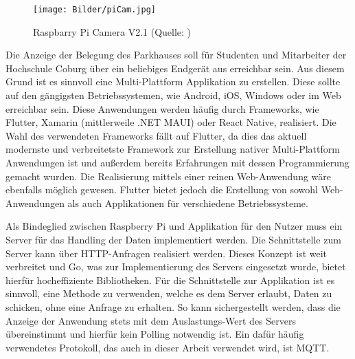 \begin{figure}[h]
	\myImagePos{}
	\texttt{[image: Bilder/piCam.jpg]}
	\caption[Raspberry Pi Camera V2.1]{Raspbarry Pi Camera V2.1 (Quelle: \cite{PiCamPIC})}
	\label{fig:PiCAM}
\end{figure}

Die Anzeige der Belegung des Parkhauses soll für Studenten und Mitarbeiter der Hochschule Coburg über ein beliebiges Endgerät aus erreichbar sein.
Aus diesem Grund ist es sinnvoll eine Multi-Plattform Applikation zu erstellen.
Diese sollte auf den gängigsten Betriebssystemen, wie Android, iOS, Windows oder im Web erreichbar sein.
Diese Anwendungen werden häufig durch Frameworks, wie Flutter, Xamarin (mittlerweile .NET MAUI) oder React Native, realisiert.
Die Wahl des verwendeten Frameworks fällt auf Flutter, da dies das aktuell modernste und verbreitetste Framework zur Erstellung nativer Multi-Plattform Anwendungen ist und außerdem bereits Erfahrungen mit dessen Programmierung gemacht wurden.
Die Realisierung mittels einer reinen Web-Anwendung wäre ebenfalls möglich gewesen.
Flutter bietet jedoch die Erstellung von sowohl Web-Anwendungen als auch Applikationen für verschiedene Betriebssysteme.

Als Bindeglied zwischen Raspberry Pi und Applikation für den Nutzer muss ein Server für das Handling der Daten implementiert werden.
Die Schnittstelle zum Server kann über HTTP-Anfragen realisiert werden.
Dieses Konzept ist weit verbreitet und Go, was zur Implementierung des Servers eingesetzt wurde, bietet hierfür hocheffiziente Bibliotheken.
Für die Schnittstelle zur Applikation ist es sinnvoll, eine Methode zu verwenden, welche es dem Server erlaubt, Daten zu schicken, ohne eine Anfrage zu erhalten.
So kann sichergestellt werden, dass die Anzeige der Anwendung stets mit dem Auslastungs-Wert des Servers übereinstimmt und hierfür kein Polling notwendig ist.
Ein dafür häufig verwendetes Protokoll, das auch in dieser Arbeit verwendet wird, ist MQTT.\@
